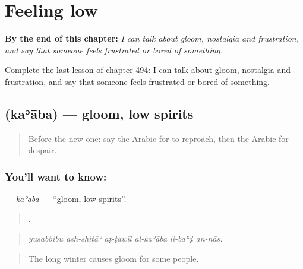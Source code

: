 
\chapter{Feeling low}
\label{ch:ar-feeling-low}

\begin{chapteropening}
\textbf{By the end of this chapter:} \emph{I can talk about gloom, nostalgia and frustration, and say that someone feels frustrated or bored of something.}

Complete the last lesson of chapter 494: I can talk about gloom, nostalgia and frustration, and say that someone feels frustrated or bored of something.
\end{chapteropening}

\section[\texorpdfstring{\ar{كآبة} (kaʾāba)}{كآبة (kaʾāba)}]{ (kaʾāba) — gloom, low spirits}

\label{lesson:AR-C494-kaaba}



\begin{quote}
Before the new one: say the Arabic for to reproach, then the Arabic for despair.
\end{quote}

\subsection*{You'll want to know: }
\textbf{} — \emph{kaʾāba} — \textquotedblleft{}gloom, low spirits\textquotedblright{}.

\begin{quote}
     .
\end{quote}

\begin{quote}
\emph{yusabbibu ash-shitāʾ aṭ-ṭawīl al-kaʾāba li-baʿḍ an-nās.}
\end{quote}

\begin{quote}
The long winter causes gloom for some people.
\end{quote}

